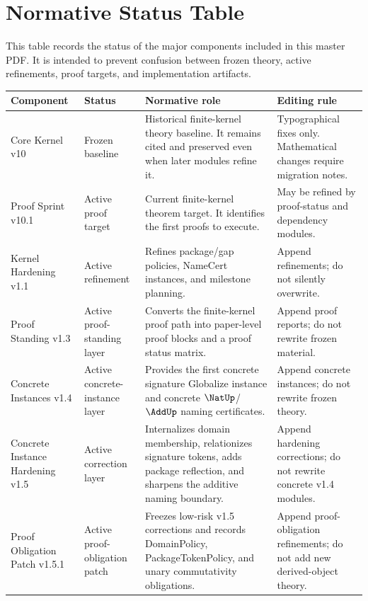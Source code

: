 \chapter*{Normative Status Table}

This table records the status of the major components included in this master PDF. It is intended to prevent confusion between frozen theory, active refinements, proof targets, and implementation artifacts.

\begin{longtable}{p{}p{}p{}p{}}
\toprule
\textbf{Component} & \textbf{Status} & \textbf{Normative role} & \textbf{Editing rule}\\
\midrule
Core Kernel v10 & Frozen baseline & Historical finite-kernel theory baseline. It remains cited and preserved even when later modules refine it. & Typographical fixes only. Mathematical changes require migration notes.\\
Proof Sprint v10.1 & Active proof target & Current finite-kernel theorem target. It identifies the first proofs to execute. & May be refined by proof-status and dependency modules.\\
Kernel Hardening v1.1 & Active refinement & Refines package/gap policies, NameCert instances, and milestone planning. & Append refinements; do not silently overwrite.\\
Proof Standing v1.3 & Active proof-standing layer & Converts the finite-kernel proof path into paper-level proof blocks and a proof status matrix. & Append proof reports; do not rewrite frozen material.\\
Concrete Instances v1.4 & Active concrete-instance layer & Provides the first concrete signature Globalize instance and concrete \(\NatUp\)/\(\AddUp\) naming certificates. & Append concrete instances; do not rewrite frozen theory.\\
Concrete Instance Hardening v1.5 & Active correction layer & Internalizes domain membership, relationizes signature tokens, adds package reflection, and sharpens the additive naming boundary. & Append hardening corrections; do not rewrite concrete v1.4 modules.\\
Proof Obligation Patch v1.5.1 & Active proof-obligation patch & Freezes low-risk v1.5 corrections and records DomainPolicy, PackageTokenPolicy, and unary commutativity obligations. & Append proof-obligation refinements; do not add new derived-object theory.\\

\end{longtable}
